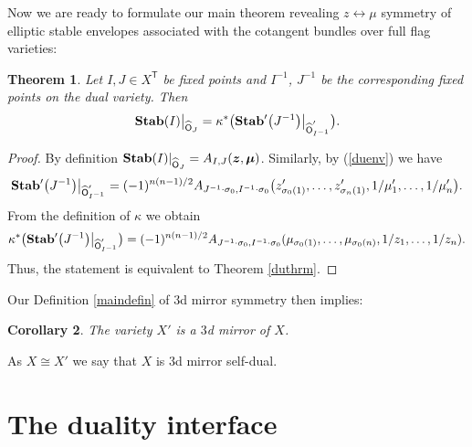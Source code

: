 \documentclass[pdftex]{sigma}
\newcommand{\bT}{\mathsf{T}}
\newcommand{\Or}{\textsf{O}}
\def\zz{{\boldsymbol z}}
\def\mub{{\boldsymbol\mu}}
\numberwithin{equation}{section}
\newtheorem{Theorem}{Theorem}[section]
\newtheorem{Corollary}[Theorem]{Corollary}
\begin{document}
Now we are ready to formulate our main theorem revealing $z\leftrightarrow \mu$ symmetry of elliptic stable envelopes associated with the cotangent bundles over full flag varieties:
 \begin{Theorem} Let $I,J \in X^{\bT}$ be fixed points and $I^{-1}$, $J^{-1}$ be the corresponding fixed points on the dual variety. Then
\begin{gather*} %
 {\bf Stab}(I)\big|_{\widehat{\Or}_{J}}=\kappa^{*}\big( {\bf Stab}'\big(J^{-1}\big)\big|_{\widehat{\Or}^{'}_{I^{-1}}}\big).
\end{gather*}
 \end{Theorem}
 \begin{proof} By definition ${\bf Stab}(I)|_{\widehat{\Or}_{J}}=A_{I,J}(\zz,\mub)$. Similarly, by (\ref{duenv}) we have
 \begin{gather*}
 {\bf Stab}'\big(J^{-1}\big)\big|_{\widehat{\Or}'_{I^{-1}}}=(-1)^{n(n-1)/2} A_{J^{-1} \cdot \sigma_{0} ,I^{-1}\cdot \sigma_{0} }\big(z_{\sigma_{0}(1)}',\dots,z_{\sigma_{n}(1)}',1/\mu'_1,\dots, 1/\mu_n'\big).
 \end{gather*}
 From the definition of $\kappa$ we obtain
 \begin{gather*}
 \kappa^{*}\big( {\bf Stab}'\big(J^{-1}\big)\big|_{\widehat{\Or}'_{I^{-1}}}\big)=
 (-1)^{n(n-1)/2} A_{J^{-1}\cdot \sigma_0,I^{-1}\cdot \sigma_{0}}(\mu_{\sigma_{0}(1)},\dots,\mu_{\sigma_{0}(n)}, 1/z_1,\dots, 1/z_n).
 \end{gather*}
Thus, the statement is equivalent to Theorem \ref{duthrm}.
\end{proof}

Our Definition \ref{maindefin} of $3$d mirror symmetry then implies:

\begin{Corollary}The variety $X'$ is a $3$d mirror of $X$.
\end{Corollary}
As $X\cong X'$ we say that $X$ is 3d mirror self-dual.

\section{The duality interface}
\end{document}
